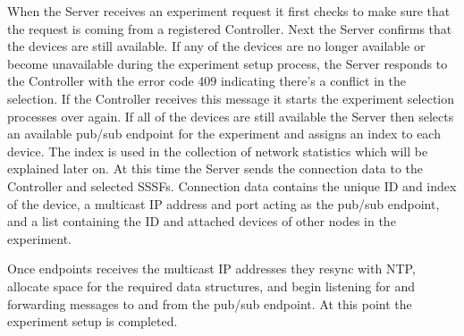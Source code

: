 \documentclass[letterpaper,twocolumn,12pt]{article}
\begin{document}
When the Server receives an experiment request it first checks to make sure that the request is coming from a registered Controller. Next the Server confirms that the devices are still available. If any of the devices are no longer available or become unavailable during the experiment setup process, the Server responds to the Controller with the error code 409 indicating there's a conflict in the selection. If the Controller receives this message it starts the experiment selection processes over again. If all of the devices are still available the Server then selects an available pub/sub endpoint for the experiment and assigns an index to each device. The index is used in the collection of network statistics which will be explained later on. At this time the Server sends the connection data to the Controller and selected SSSFs. Connection data contains the unique ID and index of the device, a multicast IP address and port acting as the pub/sub endpoint, and a list containing the ID and attached devices of other nodes in the experiment.

Once endpoints receives the multicast IP addresses they resync with NTP, allocate space for the required data structures, and begin listening for and forwarding messages to and from the pub/sub endpoint. At this point the experiment setup is completed.
\end{document}
